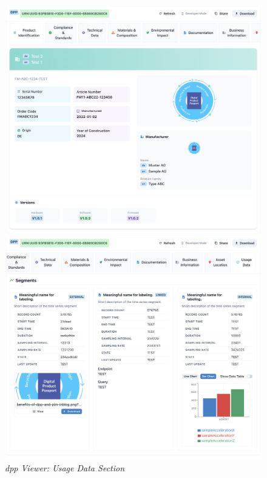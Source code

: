 \begin{figure}[htbp]
    \centering
    \begin{minipage}{0.48\textwidth}
        \centering
        \includegraphics[width=\linewidth]{figures/pilot_interface_7.png}
        \caption{%
            \textit{\ac{dpp} Viewer: Identification Section} 
        }
        \label{fig:pilot_interface_7}
    \end{minipage}
    \hfill
    \begin{minipage}{0.48\textwidth}
        \centering
        \includegraphics[width=\linewidth]{figures/pilot_interface_8.png}
        \caption{%
            \textit{\ac{dpp} Viewer: Usage Data Section} 
        }
        \label{fig:pilot_interface_8}
    \end{minipage}
\end{figure}

